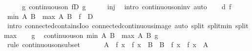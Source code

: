 \begin{isabellebody}
\ \ \isamarkupfalse%
\ \isamarkupfalse%
\ g{\isacharcolon}{\kern0pt}\ {\isachardoublequoteopen}continuous{\isacharunderscore}{\kern0pt}on\ {\isacharparenleft}{\kern0pt}f{\isacharbackquote}{\kern0pt}{\isacharquery}{\kern0pt}D{\isacharparenright}{\kern0pt}\ g{\isachardoublequoteclose}\isanewline
\ \ \ \ \isamarkupfalse%
\ inj\ \isamarkupfalse%
\ {\isacharparenleft}{\kern0pt}intro\ continuous{\isacharunderscore}{\kern0pt}on{\isacharunderscore}{\kern0pt}inv{\isacharparenright}{\kern0pt}\ auto\isanewline
\isanewline
\ \ \isamarkupfalse%
\ d\ f\ \isamarkupfalse%
\ {\isachardoublequoteopen}{\isacharbraceleft}{\kern0pt}min\ {\isacharquery}{\kern0pt}A\ {\isacharquery}{\kern0pt}B\ {\isacharless}{\kern0pt}{\isachardot}{\kern0pt}{\isachardot}{\kern0pt}{\isacharless}{\kern0pt}\ max\ {\isacharquery}{\kern0pt}A\ {\isacharquery}{\kern0pt}B{\isacharbraceright}{\kern0pt}\ {\isasymsubseteq}\ f\ {\isacharbackquote}{\kern0pt}\ {\isacharquery}{\kern0pt}D{\isachardoublequoteclose}\isanewline
\ \ \ \ \isamarkupfalse%
\ {\isacharparenleft}{\kern0pt}intro\ connected{\isacharunderscore}{\kern0pt}contains{\isacharunderscore}{\kern0pt}Ioo\ connected{\isacharunderscore}{\kern0pt}continuous{\isacharunderscore}{\kern0pt}image{\isacharparenright}{\kern0pt}\ {\isacharparenleft}{\kern0pt}auto\ split{\isacharcolon}{\kern0pt}\ split{\isacharunderscore}{\kern0pt}min\ split{\isacharunderscore}{\kern0pt}max{\isacharparenright}{\kern0pt}\isanewline
\ \ \isamarkupfalse%
\ g\ \isamarkupfalse%
\ {\isachardoublequoteopen}continuous{\isacharunderscore}{\kern0pt}on\ {\isacharbraceleft}{\kern0pt}min\ {\isacharquery}{\kern0pt}A\ {\isacharquery}{\kern0pt}B\ {\isacharless}{\kern0pt}{\isachardot}{\kern0pt}{\isachardot}{\kern0pt}{\isacharless}{\kern0pt}\ max\ {\isacharquery}{\kern0pt}A\ {\isacharquery}{\kern0pt}B{\isacharbraceright}{\kern0pt}\ g{\isachardoublequoteclose}\isanewline
\ \ \ \ \isamarkupfalse%
\ {\isacharparenleft}{\kern0pt}rule\ continuous{\isacharunderscore}{\kern0pt}on{\isacharunderscore}{\kern0pt}subset{\isacharparenright}{\kern0pt}\isanewline
\ \ \isamarkupfalse%
\isanewline
\ \ \isamarkupfalse%
\ {\isachardoublequoteopen}{\isacharparenleft}{\kern0pt}{\isacharquery}{\kern0pt}A\ {\isacharless}{\kern0pt}\ f\ x\ {\isasymand}\ f\ x\ {\isacharless}{\kern0pt}\ {\isacharquery}{\kern0pt}B{\isacharparenright}{\kern0pt}\ {\isasymor}\ {\isacharparenleft}{\kern0pt}{\isacharquery}{\kern0pt}B\ {\isacharless}{\kern0pt}\ f\ x\ {\isasymand}\ f\ x\ {\isacharless}{\kern0pt}\ {\isacharquery}{\kern0pt}A{\isacharparenright}{\kern0pt}{\isachardoublequoteclose}\isanewline

\end{isabellebody}
